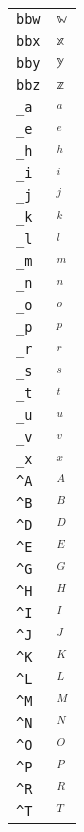 \begin{longtable}{ll}
\texttt{bbw}&${}{\mathbb{w}}{}$\\
\texttt{bbx}&${}{\mathbb{x}}{}$\\
\texttt{bby}&${}{\mathbb{y}}{}$\\
\texttt{bbz}&${}{\mathbb{z}}{}$\\
\texttt{\_a}&${}_a{}$\\
\texttt{\_e}&${}_e{}$\\
\texttt{\_h}&${}_h{}$\\
\texttt{\_i}&${}_i{}$\\
\texttt{\_j}&${}_j{}$\\
\texttt{\_k}&${}_k{}$\\
\texttt{\_l}&${}_l{}$\\
\texttt{\_m}&${}_m{}$\\
\texttt{\_n}&${}_n{}$\\
\texttt{\_o}&${}_o{}$\\
\texttt{\_p}&${}_p{}$\\
\texttt{\_r}&${}_r{}$\\
\texttt{\_s}&${}_s{}$\\
\texttt{\_t}&${}_t{}$\\
\texttt{\_u}&${}_u{}$\\
\texttt{\_v}&${}_v{}$\\
\texttt{\_x}&${}_x{}$\\
\texttt{\textasciicircum A}&${}^A{}$\\
\texttt{\textasciicircum B}&${}^B{}$\\
\texttt{\textasciicircum D}&${}^D{}$\\
\texttt{\textasciicircum E}&${}^E{}$\\
\texttt{\textasciicircum G}&${}^G{}$\\
\texttt{\textasciicircum H}&${}^H{}$\\
\texttt{\textasciicircum I}&${}^I{}$\\
\texttt{\textasciicircum J}&${}^J{}$\\
\texttt{\textasciicircum K}&${}^K{}$\\
\texttt{\textasciicircum L}&${}^L{}$\\
\texttt{\textasciicircum M}&${}^M{}$\\
\texttt{\textasciicircum N}&${}^N{}$\\
\texttt{\textasciicircum O}&${}^O{}$\\
\texttt{\textasciicircum P}&${}^P{}$\\
\texttt{\textasciicircum R}&${}^R{}$\\
\texttt{\textasciicircum T}&${}^T{}$\\

\end{longtable}
